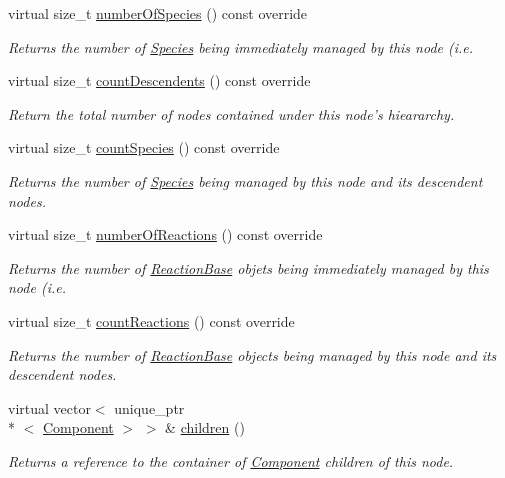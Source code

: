 \begin{DoxyCompactItemize}
virtual size\+\_\+t \hyperlink{classComposite_af36fb9ed49f7fc262c68b41f2b9a56f6}{number\+Of\+Species} () const override
\begin{DoxyCompactList}\small\item\em Returns the number of \hyperlink{classSpecies}{Species} being immediately managed by this node (i.\+e. \end{DoxyCompactList}\item 
virtual size\+\_\+t \hyperlink{classComposite_aad7cea9220c003254233ec9dc6bcb24e}{count\+Descendents} () const override
\begin{DoxyCompactList}\small\item\em Return the total number of nodes contained under this node's hieararchy. \end{DoxyCompactList}\item 
virtual size\+\_\+t \hyperlink{classComposite_ad3162a869285627b04c5388dc28e2719}{count\+Species} () const override
\begin{DoxyCompactList}\small\item\em Returns the number of \hyperlink{classSpecies}{Species} being managed by this node and its descendent nodes. \end{DoxyCompactList}\item 
virtual size\+\_\+t \hyperlink{classComposite_aee77e531ab9ccb8dcea12a307bd75539}{number\+Of\+Reactions} () const override
\begin{DoxyCompactList}\small\item\em Returns the number of \hyperlink{classReactionBase}{Reaction\+Base} objets being immediately managed by this node (i.\+e. \end{DoxyCompactList}\item 
virtual size\+\_\+t \hyperlink{classComposite_a14108b9a4f9e903ba0fd9cc40fbbd8ae}{count\+Reactions} () const override
\begin{DoxyCompactList}\small\item\em Returns the number of \hyperlink{classReactionBase}{Reaction\+Base} objects being managed by this node and its descendent nodes. \end{DoxyCompactList}\item 
virtual vector$<$ unique\+\_\+ptr\\*
$<$ \hyperlink{classComponent}{Component} $>$ $>$ \& \hyperlink{classComposite_adc22f790bd1f78a4a195a61ae60c0965}{children} ()
\begin{DoxyCompactList}\small\item\em Returns a reference to the container of \hyperlink{classComponent}{Component} children of this node. \end{DoxyCompactList}\item 

\end{DoxyCompactItemize}
